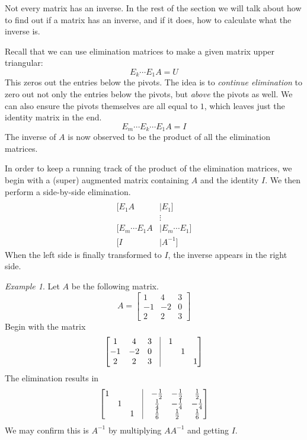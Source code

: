 \documentclass[11pt,oneside]{amsbook}
\theoremstyle{definition}
\theoremstyle{plain}
\theoremstyle{definition}
\theoremstyle{remark}
\newtheorem{example}[theorem]{Example}
\numberwithin{equation}{section}
\numberwithin{figure}{section}
\begin{document}
Not every matrix has an inverse. In the rest of the section we will talk about how to find out if a matrix has an inverse, and if it does, how to calculate what the inverse is.

Recall that we can use elimination matrices to make a given matrix upper triangular:
\[E_k\cdots E_1A=U
\]
This zeros out the entries below the pivots. The idea is to \emph{continue elimination} to zero out not only the entries below the pivots, but \emph{above} the pivots as well. We can also ensure the pivots themselves are all equal to $1$, which leaves just the identity matrix in the end.
\[E_m\cdots E_k\cdots E_1A=I
\]
The inverse of $A$ is now observed to be the product of all the elimination matrices.

In order to keep a running track of the product of the elimination matrices, we begin with a (super) augmented matrix containing $A$ and the identity $I$. We then perform a side-by-side elimination.
\begin{align*}
  [A&\mid I]\\
  [E_1A&\mid E_1]\\
    &\vdots\\
  [E_m\cdots E_1A&\mid E_m\cdots E_1]\\
  [I&\mid A^{-1}]
\end{align*}
When the left side is finally transformed to $I$, the inverse appears in the right side.

\begin{example}
  Let $A$ be the following matrix.
  \[A=\begin{bmatrix}1&4&3\\-1&-2&0\\2&2&3\end{bmatrix}
  \]
  Begin with the matrix
  \[\begin{bmatrix}
    1&4&3&\vline&1\\
    -1&-2&0&\vline&&1\\
    2&2&3&\vline&&&1
    \end{bmatrix}
  \]
  The elimination results in
  \[\begin{bmatrix}
    1&&&\vline&-\frac12&-\frac12&\frac12\\
    &1&&\vline&\frac14&-\frac14&-\frac14\\
    &&1&\vline&\frac16&\frac12&\frac16
    \end{bmatrix}
  \]
  We may confirm this is $A^{-1}$ by multiplying $AA^{-1}$ and getting $I$.
\end{example}
\end{document}
